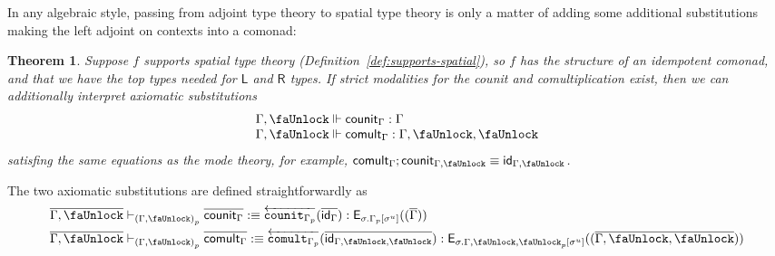 \documentclass[10pt]{article}
\newtheorem{theorem}{Theorem}
\theoremstyle{definition}
\newcommand{\yields}{\vdash}
\newcommand{\id}{\mathsf{id}}
\newcommand{\rewrite}[2]{\overleftarrow{#1}(#2)}
\newcommand\E[2]{\ensuremath{\mathsf{E}_{#1}(#2)}}
\newcommand\ctxtuple[1]{(#1)}
\newcommand\unp[2]{\ensuremath{{#2}^u}}
\newcommand{\modeof}[1]{{#1}_p}
\newcommand{\qyields}{\Vdash}
\newcommand{\upstairs}[1]{\overline{#1}}
\newcommand{\lock}{\text{\faUnlock}}
\newcommand\fcomult[1]{\ensuremath{\mathtt{comult}_{#1}}}
\newcommand\fcounit[1]{\ensuremath{\mathtt{counit}_{#1}}}
\newcommand{\counit}[1]{\mathsf{counit}_{#1}}
\newcommand{\comult}[1]{\mathsf{comult}_{#1}}
\begin{document}
In any algebraic style, passing from adjoint type theory to spatial type
theory is only a matter of adding some additional substitutions making
the left adjoint on contexts into a comonad:

\begin{theorem}
Suppose $f$ supports spatial type theory
(Definition~\ref{def:supports-spatial}), so $f$ has the
structure of an idempotent comonad, and that we have the
top types needed for $\mathsf{L}$ and $\mathsf{R}$ types.
If strict modalities for the counit and comultiplication exist,
then we can additionally interpret axiomatic substitutions
\[
\begin{array}{l}
\Gamma, \lock \qyields \counit{\Gamma} : \Gamma\\
\Gamma, \lock \qyields \comult{\Gamma} : \Gamma, \lock, \lock
\end{array}
\]
satisfing the same equations as the mode theory, for example,
$\comult{\Gamma};\counit{\Gamma, \lock} \equiv \id_{\Gamma, \lock}$.
\end{theorem}


The two axiomatic substitutions are defined straightforwardly as
\begin{align*}
\upstairs{\Gamma, \lock} &\yields_{\modeof{(\Gamma, \lock)}} \upstairs{\counit{\Gamma}} :\equiv \rewrite{\fcounit{\modeof{\Gamma}}}{\upstairs{\id_{\Gamma}}} : \E{\sigma.\modeof{\Gamma}[\unp{\Gamma}{\sigma}]}{\ctxtuple{\upstairs{\Gamma}}} \\
\upstairs{\Gamma, \lock} &\yields_{\modeof{(\Gamma, \lock)}} \upstairs{\comult{\Gamma}} :\equiv \rewrite{\fcomult{\modeof{\Gamma}}}{\upstairs{\id_{\Gamma, \lock, \lock}}} : \E{\sigma.\modeof{\Gamma, \lock, \lock}[\unp{\Gamma, \lock, \lock}{\sigma}]}{\ctxtuple{\upstairs{\Gamma, \lock, \lock}}}
\end{align*}
\end{document}
